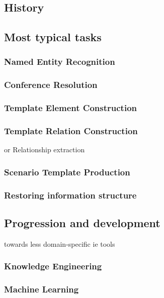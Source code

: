 \newpage
\subsection{History}

\newpage
\subsection{Most typical tasks}

\subsubsection{Named Entity Recognition}

\subsubsection{Conference Resolution}

\subsubsection{Template Element Construction}

\subsubsection{Template Relation Construction}
or Relationship extraction

\subsubsection{Scenario Template Production}

\subsubsection{Restoring information structure}

\newpage
\subsection{Progression and development}
towards less domain-specific ie tools

\subsubsection{Knowledge Engineering}

\subsubsection{Machine Learning}

